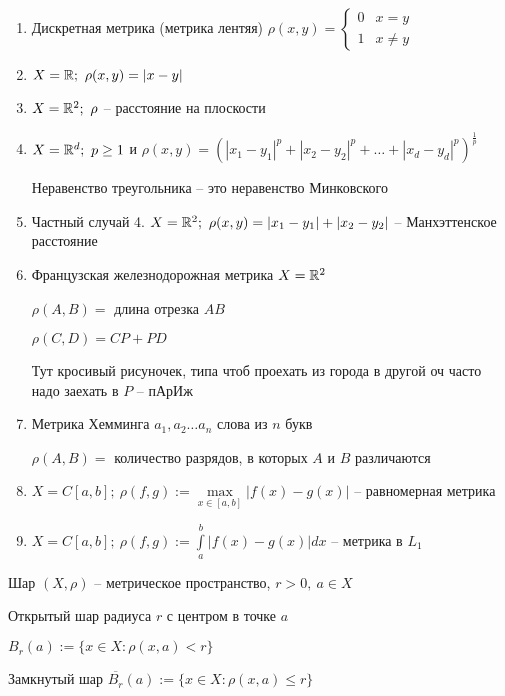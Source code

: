 \documentclass[12pt]{article}
\begin{document}
\begin{Example}{}
    \begin{enumerate}
        \item Дискретная метрика (метрика лентяя) $\rho(x, y) = \begin{cases}
            0 & x = y \\
            1 & x \neq y
        \end{cases}$
        \item $X = \mathbb R;\ \rho(x, y) = |x - y|$
        \item $X = \mathbb R^2;\ \rho$ -- расстояние на плоскости
        \item $X = \mathbb R^d;\ p \geq 1$ и $\rho(x, y) = (|x_1 - y_1|^p + |x_2 - y_2|^p + \ldots + |x_d - y_d|^p)^{\frac{1}{p}}$
        
        Неравенство треугольника -- это неравенство Минковского

        \item Частный случай 4. $X = \mathbb R^2;\ \rho(x, y) = |x_1 - y_1| + |x_2 - y_2|$ -- Манхэттенское расстояние
        
        \item Французская железнодорожная метрика $X = \mathbb R^2$
        
        $\rho(A, B) =$ длина отрезка $AB$

        $\rho(C, D) = CP + PD$

        Тут кросивый рисуночек, типа чтоб проехать из города в другой оч часто надо заехать в $P$ -- пАрИж

        \item Метрика Хемминга $a_1, a_2 \ldots a_n$ слова из $n$ букв
        
        $\rho(A, B) =$ количество разрядов, в которых $A$ и $B$ различаются

        \item $X = C[a, b];\ \rho(f, g) := \max\limits_{x \in [a, b]} |f(x) - g(x)|$ -- равномерная метрика
        \item $X = C[a, b];\ \rho(f, g) := \int\limits_a^b |f(x) - g(x)|dx$ -- метрика в $L_1$
    \end{enumerate}
\end{Example}

\begin{defin}{Шар}
    $(X, \rho)$ -- метрическое пространство, $r > 0,\ a \in X$

    Открытый шар радиуса $r$ с центром в точке $a$

    $B_r(a) := \{x \in X : \rho(x, a) < r\}$

    Замкнутый шар $\overline{B_r}(a) := \{x \in X : \rho(x, a) \leq r\}$
\end{defin}
\end{document}
